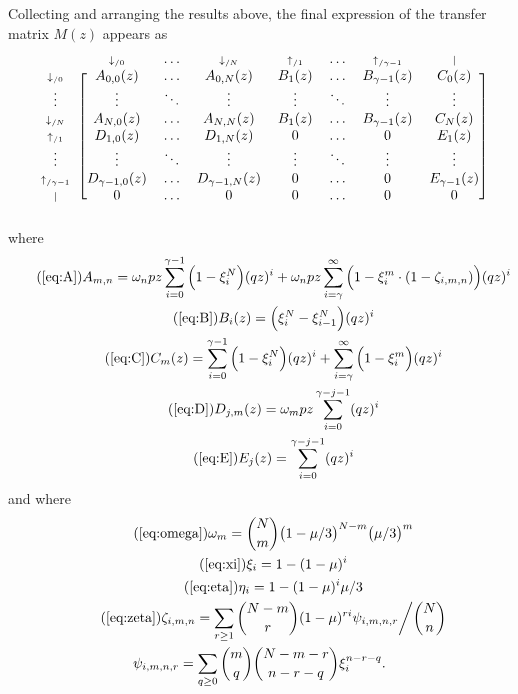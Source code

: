 \documentclass{article}
\newcommand{\dn}[1]{\scriptstyle{\downarrow_{/#1}}}
\newcommand{\up}[1]{\scriptstyle{\uparrow_{/#1}}}
\newcommand{\nd}{\scriptstyle{|}}
\begin{document}
Collecting and arranging the results above, the final expression of the
transfer matrix $M(z)$ appears as
\begin{equation*}
\begin{blockarray}{cccccccc}
   & \dn{0} & \ldots & \dn{N} & \up{1} & \ldots & \up{\gamma-1} & \nd \\
\begin{block}{c[ccccccc]}
\dn{0} & A_{0,0}(z) & \ldots & A_{0,N}(z) & B_1(z) & \ldots &
    B_{\gamma-1}(z) & C_0(z) \\
\vdots & \vdots & \ddots & \vdots & \vdots & \ddots &
    \vdots & \vdots \\
\dn{N} & A_{N,0}(z) & \ldots & A_{N,N}(z) & B_1(z) & \ldots &
    B_{\gamma-1}(z) & C_N(z) \\
\up{1} & D_{1,0}(z) & \ldots & D_{1,N}(z) & 0 & \ldots & 0 & E_1(z) \\
\vdots & \vdots & \ddots & \vdots & \vdots & \ddots &
    \vdots & \vdots \\
\up{\gamma-1} & D_{\gamma-1,0}(z) & \ldots & D_{\gamma-1,N}(z) & 0 &
  \ldots & 0 & E_{\gamma-1}(z) \\
\nd & 0 & \ldots & 0 & 0 & \ldots & 0 & 0 \\
\end{block}
\end{blockarray}
\end{equation*}
where
\begin{gather}
\tag{\ref{eq:A}}
A_{m,n} =
\omega_n pz \sum_{i=0}^{\gamma-1} \Big(1 - \xi_i^N \Big) (qz)^i + \omega_n
pz \sum_{i=\gamma}^\infty \Big(1 - \xi_i^m \cdot
(1- \zeta_{i,m,n}) \Big) (qz)^i \\
\tag{\ref{eq:B}}
B_i(z) = \Big( \xi_i^N-\xi_{i-1}^N \Big) (qz)^i \\
\tag{\ref{eq:C}}
C_m(z) =
\sum_{i=0}^{\gamma-1} \Big(1 - \xi_i^N \Big) (qz)^i +
  \sum_{i=\gamma}^\infty \Big(1 - \xi_i^m \Big) (qz)^i \\
\tag{\ref{eq:D}}
D_{j,m}(z) = \omega_m pz \sum_{i=0}^{\gamma-j-1} (qz)^i \\
\tag{\ref{eq:E}}
E_j(z) = \sum_{i=0}^{\gamma-j-1} (qz)^i
\end{gather}
and where
\begin{gather}
\tag{\ref{eq:omega}}
\omega_m = {N \choose m} \big(1 - \mu/3\big)^{N-m} \big(\mu/3\big)^m \\
\tag{\ref{eq:xi}}
\xi_i = 1-(1-\mu)^i \\
\tag{\ref{eq:eta}}
\eta_i = 1-(1-\mu)^i\mu/3 \\
\tag{\ref{eq:zeta}}
\zeta_{i,m,n} = \sum_{r\geq1} {N-m \choose r}
(1-\mu)^{ri} \psi_{i,m,n,r} \bigg/ {N \choose n} \\
\notag
\psi_{i,m,n,r} = \sum_{q \geq 0}{m \choose q}{N-m-r \choose n-r-q}
\xi_i^{n-r-q}.
\end{gather}
\end{document}
